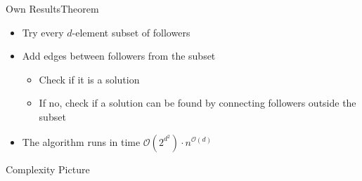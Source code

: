 \begin{frame}{Own Results}{Theorem}
    \begin{center}
    \end{center}

    \begin{itemize}
        \item Try every $d$-element subset of followers
        \item Add edges between followers from the subset
        \begin{itemize}
            \item Check if it is a solution
            \item If no, check if a solution can be found by connecting followers outside the subset 
        \end{itemize}
        \item The algorithm runs in time $\mathcal{O}(2^{d^2}) \cdot n^{\mathcal{O}(d)}$
    \end{itemize}
\end{frame}

\begin{frame}{\HLdeg Complexity Picture}
    
\end{frame}
